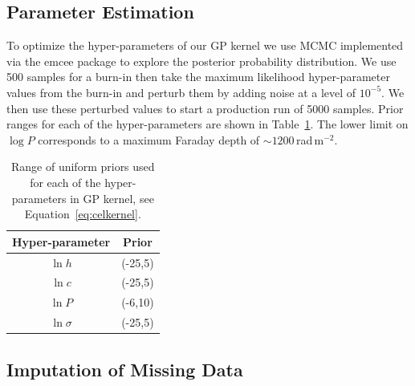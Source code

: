 \documentclass[fleqn,usenatbib]{mnras}
\begin{document}
\subsection{Parameter Estimation}
\label{sec:optimization}

To optimize the hyper-parameters of our GP kernel we use MCMC implemented via the {\sc emcee} package \citep{emcee} to explore the posterior probability distribution. We use 500 samples for a burn-in then take the maximum likelihood hyper-parameter values from the burn-in and perturb them by adding noise at a level of $10^{-5}$. We then use these perturbed values to start a production run of 5000 samples. Prior ranges for each of the hyper-parameters are shown in Table~\ref{tab:priors}. The lower limit on $\log P$ corresponds to a maximum Faraday depth of $\sim1200$\,rad\,m$^{-2}$.
%
\begin{table}
\caption{\label{tab:priors} Range of uniform priors used for each of the hyper-parameters in GP kernel, see Equation~\ref{eq:celkernel}.}
\centering
\begin{tabular}{|c|c|}
\hline
Hyper-parameter & Prior \\\hline
$\ln h$ & (-25,5)\\
$\ln c$ & (-25,5)\\
$\ln P$ & (-6,10)\\
$\ln \sigma$ & (-25,5)\\\hline
\end{tabular}
\end{table}


\subsection{Imputation of Missing Data}
\label{sec:missing}
\end{document}
